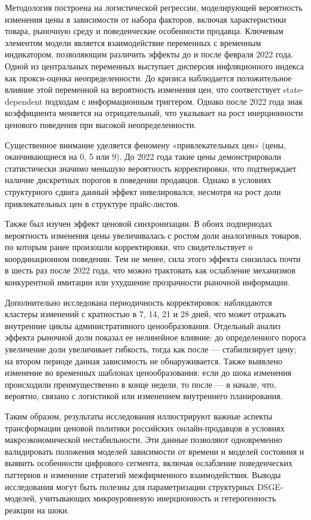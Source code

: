 Методология построена на логистической регрессии, моделирующей вероятность изменения цены в зависимости от набора факторов, включая характеристики товара, рыночную среду и поведенческие особенности продавца. Ключевым элементом модели является взаимодействие переменных с временным индикатором, позволяющим различить эффекты до и после февраля 2022 года. Одной из центральных переменных выступает дисперсия инфляционного индекса как прокси-оценка неопределенности. До кризиса наблюдается положительное влияние этой переменной на вероятность изменения цен, что соответствует state-dependent подходам с информационным триггером. Однако после 2022 года знак коэффициента меняется на отрицательный, что указывает на рост инерционности ценового поведения при высокой неопределенности.

Существенное внимание уделяется феномену «привлекательных цен» (цены, оканчивающиеся на 0, 5 или 9). До 2022 года такие цены демонстрировали статистически значимо меньшую вероятность корректировки, что подтверждает наличие дискретных порогов в поведении продавцов. Однако в условиях структурного сдвига данный эффект нивелировался, несмотря на рост доли привлекательных цен в структуре прайс-листов.

Также был изучен эффект ценовой синхронизации. В обоих подпериодах вероятность изменения цены увеличивалась с ростом доли аналогичных товаров, по которым ранее произошли корректировки, что свидетельствует о координационном поведении. Тем не менее, сила этого эффекта снизилась почти в шесть раз после 2022 года, что можно трактовать как ослабление механизмов конкурентной имитации или ухудшение прозрачности рыночной информации.

Дополнительно исследована периодичность корректировок: наблюдаются кластеры изменений с кратностью в 7, 14, 21 и 28 дней, что может отражать внутренние циклы административного ценообразования. Отдельный анализ эффекта рыночной доли показал ее нелинейное влияние: до определенного порога увеличение доли увеличивает гибкость, тогда как после — стабилизирует цену; на втором периоде данная зависимость не обнаруживается. Также выявлено изменение во временных шаблонах ценообразования: если до шока изменения происходили преимущественно в конце недели, то после — в начале, что, вероятно, связано с логистикой или изменением внутреннего планирования.

Таким образом, результаты исследования иллюстрируют важные аспекты трансформации ценовой политики российских онлайн-продавцов в условиях макроэкономической нестабильности. Эти данные позволяют одновременно валидировать положения моделей зависимости от времени и моделей состояния и выявить особенности цифрового сегмента, включая ослабление поведенческих паттернов и изменение стратегий межфирменного взаимодействия. Выводы исследования могут быть полезны для параметризации структурных DSGE-моделей, учитывающих микроуровневую инерционность и гетерогенность реакции на шоки.

